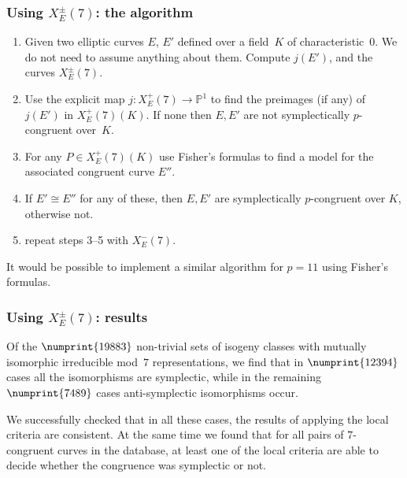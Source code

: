 \documentclass[compress]{beamer}
\newcommand{\PP}{\mathbb P}
\begin{document}
\begin{frame}\frametitle{Using $X_E^{\pm}(7)$: the algorithm}
\begin{enumerate}
\item Given two elliptic curves $E$, $E'$ defined over a field~$K$ of
  characteristic~$0$. We do not need to assume anything about them.
  Compute $j(E')$, and the curves $X_E^{\pm}(7)$.
\item Use the explicit map $j:X_E^+(7)\to\PP^1$ to find the preimages
  (if any) of $j(E')$ in $X_E^+(7)(K)$.  If none then $E,E'$ are not
  symplectically $p$-congruent over~$K$.
\item For any $P\in X_E^+(7)(K)$ use Fisher's formulas to find a model
  for the associated congruent curve $E''$.
\item If $E'\cong E''$ for any of these, then $E,E'$ are
  symplectically $p$-congruent
  over $K$, otherwise not.
\item repeat steps 3--5 with $X_E^-(7)$.
\end{enumerate}
\pause
It would be possible to implement a similar algorithm for $p=11$ using
Fisher's formulas.
\end{frame}

\begin{frame}\frametitle{Using $X_E^{\pm}(7)$: results}
Of the $\numprint{19883}$ non-trivial sets of isogeny classes with mutually
isomorphic irreducible mod~$7$ representations, we find that in
$\numprint{12394}$ cases all the isomorphisms are symplectic, while in the
remaining $\numprint{7489}$ cases anti-symplectic isomorphisms occur.
\medskip
\pause

We successfully checked that in all these cases, the results of
applying the local criteria are consistent.  At the same time we found
that for all pairs of $7$-congruent curves in the database, at least
one of the local criteria are able to decide whether the congruence
was symplectic or not.


\end{frame}
\end{document}
